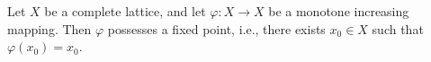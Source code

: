 Let $X$ be a complete lattice, and let $\varphi : X \to X$ be a monotone increasing mapping. Then $\varphi$ possesses a fixed point, i.e., there exists $x_0 \in X$ such that $\varphi(x_0) = x_0$.
